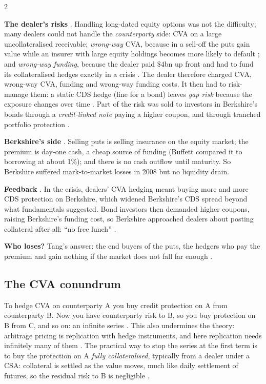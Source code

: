 \begin{paracol}{2}
\begin{casestudy}
\textbf{The dealer's risks} . Handling long-dated equity options was not the difficulty; many dealers
could not handle the \emph{counterparty} side: CVA on a large uncollateralised receivable; \emph{wrong-way} CVA,
because in a sell-off the puts gain value while an insurer with large equity holdings becomes more likely to
default ; and \emph{wrong-way funding}, because the dealer paid $\$4$bn up front and had to fund
its collateralised hedges exactly in a crisis . The dealer therefore charged CVA, wrong-way CVA,
funding and wrong-way funding costs. It then had to risk-manage them: a static CDS hedge (fine for a bond) leaves
\emph{gap risk} because the exposure changes over time . Part of the risk was sold to investors
in Berkshire's bonds through a \emph{credit-linked note} paying a higher coupon, and through tranched portfolio
protection .

\textbf{Berkshire's side} . Selling puts is selling insurance on the equity market; the premium
is day-one cash, a cheap source of funding (Buffett compared it to borrowing at about 1\%); and there is no cash
outflow until maturity. So Berkshire suffered mark-to-market losses in 2008 but no liquidity drain.

\textbf{Feedback} . In the crisis, dealers' CVA hedging meant buying more and more CDS
protection on Berkshire, which widened Berkshire's CDS spread beyond what fundamentals suggested. Bond investors
then demanded higher coupons, raising Berkshire's funding cost, so Berkshire approached dealers about posting
collateral after all: ``no free lunch'' .

\textbf{Who loses?} Tang's answer: the end buyers of the puts, the hedgers who pay the premium and gain nothing if
the market does not fall far enough .
\end{casestudy}

\subsection{The CVA conundrum}
To hedge CVA on counterparty A you buy credit protection on A from counterparty B. Now you have counterparty risk
to B, so you buy protection on B from C, and so on: an infinite series . This also undermines
the theory: arbitrage pricing is replication with hedge instruments, and here replication needs infinitely many
of them . The practical way to stop the series at the first term is to buy the protection on A
\emph{fully collateralised}, typically from a dealer under a CSA: collateral is settled as the value moves, much
like daily settlement of futures, so the residual risk to B is negligible .


\end{paracol}
